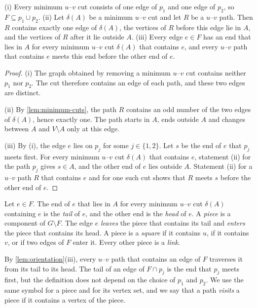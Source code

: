 \begin{lemma}
\label{lem:orientation}
(i) Every minimum $u$--$v$ cut consists of one edge of $p_1$ and one edge of $p_2$, so $F \subseteq p_1 \cup p_2$.
(ii) Let $\delta(A)$ be a minimum $u$--$v$ cut and let $R$ be a $u$--$v$ path.
Then $R$ contains exactly one edge of $\delta(A)$, the vertices of $R$ before this edge lie in $A$, and the vertices of $R$ after it lie outside $A$.
(iii) Every edge $e \in F$ has an end that lies in $A$ for every minimum $u$--$v$ cut $\delta(A)$ that contains $e$, and every $u$--$v$ path that contains $e$ meets this end before the other end of $e$.
\end{lemma}

\begin{proof}
(i) The graph obtained by removing a minimum $u$--$v$ cut contains neither $p_1$ nor $p_2$.
The cut therefore contains an edge of each path, and these two edges are distinct.

(ii) By \cref{lem:minimum-cuts}, the path $R$ contains an odd number of the two edges of $\delta(A)$, hence exactly one.
The path starts in $A$, ends outside $A$ and changes between $A$ and $V \setminus A$ only at this edge.

(iii) By (i), the edge $e$ lies on $p_j$ for some $j \in \{1, 2\}$.
Let $s$ be the end of $e$ that $p_j$ meets first.
For every minimum $u$--$v$ cut $\delta(A)$ that contains $e$, statement (ii) for the path $p_j$ gives $s \in A$, and the other end of $e$ lies outside $A$.
Statement (ii) for a $u$--$v$ path $R$ that contains $e$ and for one such cut shows that $R$ meets $s$ before the other end of $e$.
\end{proof}

\begin{definition}
\label{def:pieces}
Let $e \in F$.
The end of $e$ that lies in $A$ for every minimum $u$--$v$ cut $\delta(A)$ containing $e$ is the \emph{tail} of $e$, and the other end is the \emph{head} of $e$.
A \emph{piece} is a component of $G \setminus F$.
The edge $e$ \emph{leaves} the piece that contains its tail and \emph{enters} the piece that contains its head.
A piece is a \emph{square} if it contains $u$, if it contains $v$, or if two edges of $F$ enter it.
Every other piece is a \emph{link}.
\end{definition}

By \cref{lem:orientation}(iii), every $u$--$v$ path that contains an edge of $F$ traverses it from its tail to its head.
The tail of an edge of $F \cap p_j$ is the end that $p_j$ meets first, but the definition does not depend on the choice of $p_1$ and $p_2$.
We use the same symbol for a piece and for its vertex set, and we say that a path \emph{visits} a piece if it contains a vertex of the piece.

